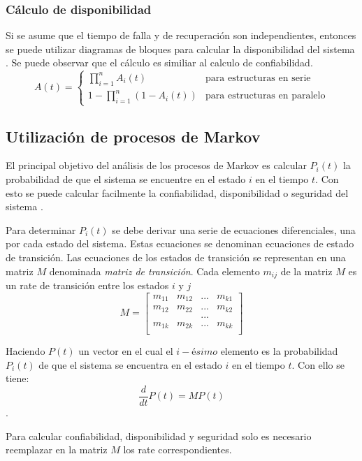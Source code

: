 \subsubsection{Cálculo de disponibilidad}
Si se asume que el tiempo de falla y de recuperación son independientes, entonces se puede utilizar diagramas de bloques para calcular la disponibilidad
del sistema  \citep{FTDesign}.  Se puede observar que el cálculo es similiar al calculo de confiabilidad.
 $$A(t) = \left \{
 \begin{matrix}
   \prod_{i=1}^{n} A_{i}(t) & \text{para estructuras en serie}\\
   1 - \prod_{i=1}^{n}(1-A_{i}(t)) & \text{para estructuras en paralelo}
 \end{matrix} $$

\subsection{Utilización de procesos de Markov}
El principal objetivo del análisis de los procesos de Markov es calcular $P_i(t)$ la probabilidad de que el sistema se encuentre en el estado $i$
en el tiempo $t$. Con esto se puede calcular facilmente la confiabilidad, disponibilidad o seguridad del sistema \citep{FTDesign}.

Para determinar $P_i(t)$ se debe derivar una serie de ecuaciones diferenciales, una por cada estado del sistema. Estas ecuaciones se denominan ecuaciones de estado de transición. Las ecuaciones de los estados de transición se representan en una matriz $M$ denominada \textit{matriz de transición}. Cada elemento $m_{ij}$ de la matriz $M$ es un rate de transición entre los estados $i$ y $j$
$$M = \left [
\begin{matrix}
  m_{11}  & m_{12}  & ... & m_{k1} \\
  m_{12}  & m_{22}  & ... & m_{k2} \\
          &         & ... &        \\
  m_{1k}  & m_{2k}  & ... & m_{kk} \\
\end{matrix}
\right ]
$$

Haciendo $P(t)$ un vector en el cual el $i-ésimo$ elemento es la probabilidad $P_i(t)$ de que el sistema se encuentra en el estado $i$ en el tiempo $t$. Con ello se tiene: $$\frac{d}{dt}P(t) = MP(t)$$ \citep{FTDesign}.

Para calcular confiabilidad, disponibilidad y seguridad solo es necesario reemplazar en la matriz $M$ los rate correspondientes.
